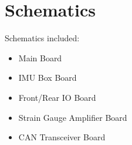 \documentclass[12pt, notitlepage]{report}
\begin{document}
\glsaddall %

\printglossaries

\chapter{Schematics}
Schematics included:
\begin{itemize}
    \item Main Board
    \item IMU Box Board
    \item Front/Rear IO Board
    \item Strain Gauge Amplifier Board
    \item CAN Transceiver Board
\end{itemize}






\end{document}
